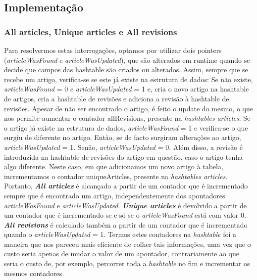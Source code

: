 \documentclass[a4paper]{article}
\begin{document}
\subsection{Implementação}

\subsubsection{All articles, Unique articles e All revisions}
Para resolvermos estas interrogações, optamos por utilizar dois pointers (\textit{articleWasFound} e \textit{articleWasUpdated}), que são alterados em runtime quando se decide que campos das hashtable são criados ou alterados.
Assim, sempre que se recebe um artigo, verifica-se se este já existe na estrutura de dados:
Se não existe, \textit{articleWasFound} = 0 e \textit{articleWasUpdated} = 1 e, cria o novo artigo na hashtable de artigos, cria a hashtable de revisões e adiciona a revisão à hashtable de revisões. Apesar de não ser encontrado o artigo, é feito o update do mesmo, o que nos permite aumentar o contador allRevisions, presente na \textit{hashtables articles}.
Se o artigo já existe na estrutura de dados, \textit{articleWasFound} = 1 e verifica-se o que surgiu de diferente no artigo. Então, se de facto surgiram alterações ao artigo, \textit{articleWasUpdated} = 1. Senão, \textit{articleWasUpdated} = 0. Além disso, a revisão é introduzida na hashtable de revisões do artigo em questão, caso o artigo tenha algo diferente. Neste caso, em que adicionamos um novo artigo à tabela, incrementamos o contador uniqueArticles, presente na \textit{hashtables articles}.
Portanto, \textbf{\textit{All articles}} é alcançado a partir de um contador que é incrementado sempre que é encontrado um artigo, independentemente dos apontadores \textit{articleWasFound} e \textit{articleWasUpdated}. \textbf{\textit{Unique articles}} é devolvido a partir de um contador que é incrementado se e só se o \textit{articleWasFound} está com valor 0. \textbf{\textit{All revisions}} é calculado também a partir de um contador que é incrementado quando o \textit{articleWasUpdated} = 1.
Termos estes contadores na \textit{hashtable} foi a maneira que nos pareceu mais eficiente de colher tais informações, uma vez que o custo seria apenas de mudar o valor de um apontador, contrariamente ao que seria o custo de, por exemplo, percorrer toda a \textit{hashtable} no fim e incrementar os mesmos contadores.
\end{document}

